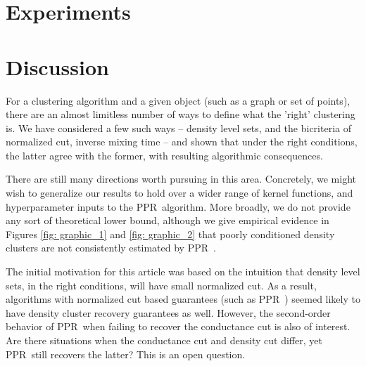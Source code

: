 \documentclass{article}
\newcommand{\1}{\mathbf{1}}
\newcommand{\pprspace}{{\sc PPR~}}
\theoremstyle{aldenthm}
\theoremstyle{aldenrmrk}
\begin{document}
\section{Experiments}
\label{sec: experiments}


\section{Discussion}
\label{sec: discussion}
For a clustering algorithm and a given object (such as a graph or set of points), there are an almost limitless number of ways to define what the 'right' clustering is. We have considered a few such ways -- density level sets, and the bicriteria of normalized cut, inverse mixing time -- and shown that under the right conditions, the latter agree with the former, with resulting algorithmic consequences.

There are still many directions worth pursuing in this area. Concretely, we might wish to generalize our results to hold over a wider range of kernel functions, and hyperparameter inputs to the \pprspace algorithm. More broadly, we do not provide any sort of theoretical lower bound, although we give empirical evidence in Figures \ref{fig: graphic_1} and \ref{fig: graphic_2} that poorly conditioned density clusters are not consistently estimated by \pprspace.

The initial motivation for this article was based on the intuition that density level sets, in the right conditions, will have small normalized cut. As a result, algorithms with normalized cut based guarantees (such as \pprspace) seemed likely to have density cluster recovery guarantees as well. However, the second-order behavior of \pprspace when failing to recover the conductance cut is also of interest. Are there situations when the conductance cut and density cut differ, yet \pprspace still recovers the latter? This is an open question.

\clearpage



\end{document}
